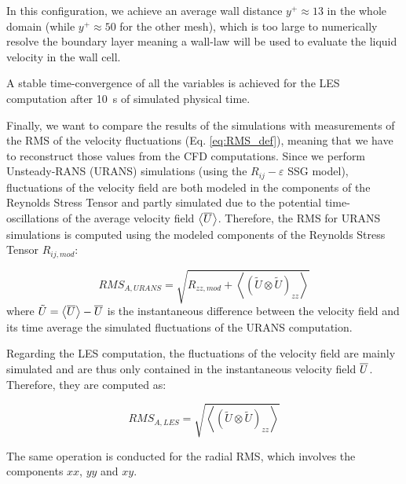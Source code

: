 \npar


In this configuration, we achieve an average wall distance $y^{+} \approx 13$ in the whole domain (while $y^{+} \approx 50$ for the other mesh), which is too large to numerically resolve the boundary layer meaning a wall-law will be used to evaluate the liquid velocity in the wall cell. 

\begin{note*}{}
A stable time-convergence of all the variables is achieved for the LES computation after 10~s of simulated physical time.
\end{note*}

\npar

Finally, we want to compare the results of the simulations with measurements of the RMS of the velocity fluctuations (Eq. \ref{eq:RMS_def}), meaning that we have to reconstruct those values from the CFD computations. Since we perform Unsteady-RANS (URANS) simulations (using the $R_{ij}-\varepsilon$ SSG model), fluctuations of the velocity field are both modeled in the components of the Reynolds Stress Tensor and partly simulated due to the potential time-oscillations of the average velocity field $\left<\overline{U}\right>$. Therefore, the RMS for URANS simulations is computed using the modeled components of the Reynolds Stress Tensor $R_{ij,mod}$:

\begin{equation}
RMS_{A,URANS} = \sqrt{R_{zz,mod} + \left< \left(\tilde{U} \otimes \tilde{U}\right)_{zz}\right>}
\label{eq:RMS_URANS}
\end{equation}
where $\tilde{U} = \left<\overline{U}\right> - \overline{U}$ is the instantaneous difference between the velocity field and its time average \ie the simulated fluctuations of the URANS computation.

\npar

Regarding the LES computation, the fluctuations of the velocity field are mainly simulated and are thus only contained in the instantaneous velocity field $\overline{U}$. Therefore, they are computed as:

\begin{equation}
RMS_{A,LES} = \sqrt{\left< \left(\tilde{U} \otimes \tilde{U}\right)_{zz} \right>}
\label{eq:RMS_LES}
\end{equation}

\npar

The same operation is conducted for the radial RMS, which involves the components ${xx}$, ${yy}$ and ${xy}$.



